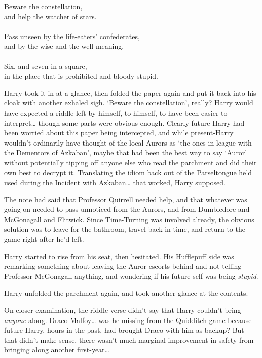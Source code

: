 \begin{writtenNote}
Beware the constellation,\\
and help the watcher of stars.\\
\\
Pass unseen by the life-eaters' confederates,\\
and by the wise and the well-meaning.\\
\\
Six, and seven in a square,\\
in the place that is prohibited and bloody stupid.
\end{writtenNote}

Harry took it in at a glance, then folded the paper again and put it back into his cloak with another exhaled sigh. `Beware the constellation', really? Harry would have expected a riddle left by himself, to himself, to have been easier to interpret{\ldots} though some parts were obvious enough. Clearly future-Harry had been worried about this paper being intercepted, and while present-Harry wouldn't ordinarily have thought of the local Aurors as `the ones in league with the Dementors of Azkaban', maybe that had been the best way to say `Auror' without potentially tipping off anyone else who read the parchment and did their own best to decrypt it. Translating the idiom back out of the Parseltongue he'd used during the Incident with Azkaban{\ldots} that worked, Harry supposed.

The note had said that Professor Quirrell needed help, and that whatever was going on needed to pass unnoticed from the Aurors, and from Dumbledore and McGonagall and Flitwick. Since Time-Turning was involved already, the obvious solution was to leave for the bathroom, travel back in time, and return to the game right after he'd left.

Harry started to rise from his seat, then hesitated. His Hufflepuff side was remarking something about leaving the Auror escorts behind and not telling Professor McGonagall anything, and wondering if his future self was being \emph{stupid}.

Harry unfolded the parchment again, and took another glance at the contents.

On closer examination, the riddle-verse didn't say that Harry couldn't bring \emph{anyone} along. Draco Malfoy{\ldots} was he missing from the Quidditch game because future-Harry, hours in the past, had brought Draco with him as backup? But that didn't make sense, there wasn't much marginal improvement in safety from bringing along another first-year{\ldots}

